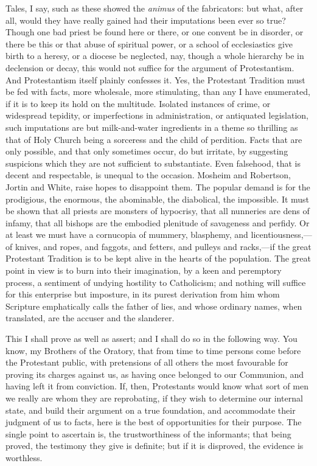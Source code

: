Tales, I say, such as these showed the \emph{animus}
of the fabricators: but what, after all, would they have
really gained had their imputations been ever so true?
Though one bad priest be found here or there, or one
convent be in disorder, or there be this or that abuse of
spiritual power, or a school of ecclesiastics give birth
to a heresy, or a diocese be neglected, nay, though a
whole hierarchy be in declension or decay, this would not
suffice for the argument of Protestantism. And
Protestantism itself plainly confesses it. Yes, the
Protestant Tradition must be fed with facts, more
wholesale, more stimulating, than any I have enumerated,
if it is to keep its hold on the multitude. Isolated
instances of crime, or widespread tepidity, or
imperfections in administration, or antiquated
legislation, such imputations are but milk-and-water
ingredients in a theme so thrilling as that of Holy
Church being a sorceress and the child of perdition.
Facts that are only possible, and that only sometimes
occur, do but irritate, by suggesting suspicions which
they are not sufficient to substantiate. Even falsehood,
that is decent and respectable, is unequal to the
occasion. Mosheim and Robertson, Jortin and White, raise
hopes to disappoint them. The popular demand is for the
prodigious, the enormous, the abominable, the diabolical,
the impossible. It must be shown that all priests are
monsters of hypocrisy, that all nunneries are dens of
infamy, that all bishops are the embodied plenitude of
savageness and perfidy. Or at least we must have a
cornucopia of mummery, blasphemy, and
licentiousness,—of knives, and ropes, and faggots,
and fetters, and pulleys and racks,—if the great
Protestant Tradition is to be kept alive in the hearts of
the population. The great point in view is to burn into
their imagination, by a keen and peremptory process, a
sentiment of undying hostility to Catholicism; and
nothing will suffice for this enterprise but imposture,
in its purest derivation from him whom Scripture
emphatically calls the father of lies, and whose ordinary
names, when translated, are the accuser and the
slanderer.

This I shall prove as well as assert; and I shall do
so in the following way. You know, my Brothers of the
Oratory, that from time to time persons come before the
Protestant public, with pretensions of all others the
most favourable for proving its charges against us, as
having once belonged to our Communion, and having left it
from conviction. If, then, Protestants would know what
sort of men we really are whom they are reprobating, if
they wish to determine our internal state, and build
their argument on a true foundation, and accommodate
their judgment of us to facts, here is the best of
opportunities for their purpose. The single point to
ascertain is, the trustworthiness of the informants; that
being proved, the testimony they give is definite; but if
it is disproved, the evidence is worthless.

